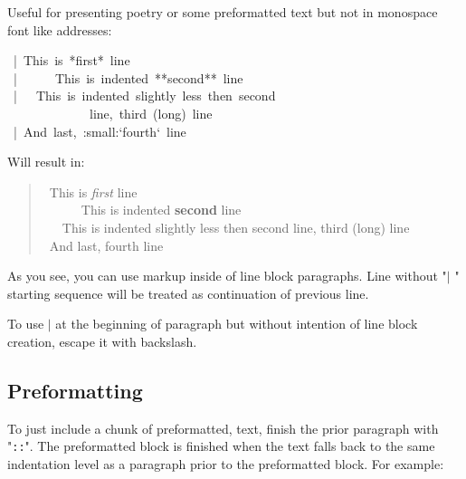 \documentclass[12pt]{article}
\begin{document}
Useful for presenting poetry or some preformatted text but not in monospace
font like addresses:

\begin{ttfamily}\begin{flushleft}
\mbox{~|~This~is~*first*~line}\\
\mbox{~|~~~~~~This~is~indented~**second**~line}\\
\mbox{~|~~~This~is~indented~slightly~less~then~second}\\
\mbox{~~~~~~~~~~~~~line,~third~(long)~line}\\
\mbox{~|~And~last,~:small:`fourth`~line}\\
\end{flushleft}\end{ttfamily}

Will result in:

\begin{verse}
~This is \emph{first} line\\
~~~~~~This is indented \textbf{second} line\\
~~~This is indented slightly less then second
 line, third (long) line\\
~And last, {\small fourth} line
\end{verse}

As you see, you can use markup inside of line block paragraphs. Line without
"$|$ " starting sequence will be treated as continuation of previous line.

To use $|$ at the beginning of paragraph but without intention of line block
creation, escape it with backslash.

\begin{center}
\end{center}

\hypertarget{ldouble-colon}{}

\hypertarget{lpreformatting}{}
\subsection{Preformatting}

To just include a chunk of preformatted, text, finish the prior
paragraph with "\texttt{::}". The preformatted block is finished when the
text falls back to the same indentation level as a paragraph prior to
the preformatted block. For example:
\end{document}
